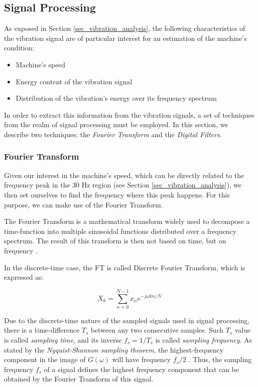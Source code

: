 \documentclass[conference]{IEEEtran}
\begin{document}
\subsection{Signal Processing}
\label{sec_signal_processing}

As exposed in Section \ref{sec_vibration_analysis}, the following characteristics of the vibration signal are of particular interest for an estimation of the machine's condition:

\begin{itemize}
	\item Machine's speed
	\item Energy content of the vibration signal
	\item Distribution of the vibration's energy over its frequency spectrum
\end{itemize}


In order to extract this information from the vibration signals, a set of techniques from the realm of signal processing must be employed. In this section, we describe two techniques: the \textit{Fourier Transform} and the \textit{Digital Filters}.

\subsubsection{Fourier Transform}

Given our interest in the machine's speed, which can be directly related to the frequency peak in the 30 Hz region (see Section \ref{sec_vibration_analysis}), we then set ourselves to find the frequency where this peak happens. For this purpose, we can make use of the Fourier Transform.

The Fourier Transform is a mathematical transform widely used to decompose a time-function into multiple sinusoidal functions distributed over a frequency spectrum. The result of this transform is then not based on time, but on frequency \cite{b4}.

In the discrete-time case, the FT is called Discrete Fourier Transform, which is expressed as: 

\begin{equation}
	\label{eq_fourier_disc}
	X_{k} = \sum_{n = 0}^{N-1} x_{n}e^{-j \omega kn/N}
\end{equation}



Due to the discrete-time nature of the sampled signals used in signal processing, there is a time-difference $T_{s}$ between any two consecutive samples. Such $T_{s}$ value is called \textit{sampling time}, and its inverse $f_{s}=1/T_{s}$ is called \textit{sampling frequency}. As stated by the \textit{Nyquist-Shannon sampling theorem}, the highest-frequency component in the image of $G(\omega)$ will have frequency $f_{s}/2$ \cite{b5}. Thus, the sampling frequency $f_{s}$ of a signal defines the highest frequency component that can be obtained by the Fourier Transform of this signal.
\end{document}
